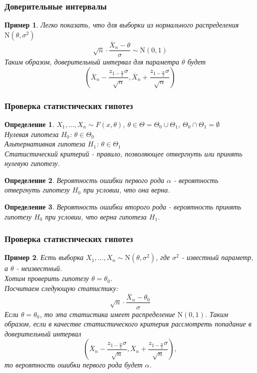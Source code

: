 \documentclass{beamer}
\newtheorem{defn}{Определение}
\newtheorem{exmp}{Пример}
\begin{document}
\begin{frame}
\frametitle{Доверительные интервалы}
\begin{exmp}
Легко показать, что для выборки из нормального распределения $\mathrm{N}(\theta,\sigma^2)$
$$\sqrt{n} \cdot \frac{\overline{X}_n - \theta}{\sigma} \sim \mathrm{N}(0,1)$$
Таким образом, доверительный интервал для параметра $\theta$ будет
$$(\overline{X}_n-\frac{z_{1-\frac{\alpha}{2}}\sigma}{\sqrt{n}},\overline{X}_n+\frac{z_{1-\frac{\alpha}{2}}\sigma}{\sqrt{n}})$$
\end{exmp}
\end{frame}

\begin{frame}
\frametitle{Проверка статистических гипотез}
\begin{defn}
$X_1,\ldots,X_n\sim F(x,\theta)$, $\theta \in \Theta=\Theta_0\cup\Theta_1$, $\Theta_0\cap\Theta_1=\emptyset$\\
Нулевая гипотеза $H_0$: $\theta \in \Theta_0$\\
Альтернативная гипотеза $H_1$: $\theta \in \Theta_1$\\
Статистический критерий - правило, позволяющее отвергнуть или принять нулевую гипотезу.
\end{defn}
\begin{defn}
Вероятность ошибки первого рода $\alpha$ - вероятность отвергнуть гипотезу $H_0$ при условии, что она верна.
\end{defn}
\begin{defn}
Вероятность ошибки второго рода - вероятность принять гипотезу $H_0$ при условии, что верна гипотеза $H_1$.
\end{defn}

\end{frame}

\begin{frame}
\frametitle{Проверка статистических гипотез}
\begin{exmp}
Есть выборка $X_1,\ldots,X_n\sim\mathrm{N}(\theta,\sigma^2)$, где $\sigma^2$ - известный параметр, а $\theta$ - неизвестный. \\Хотим проверить гипотезу $\theta=\theta_0$.\\
Посчитаем следующую статистику:
$$\sqrt{n} \cdot \frac{\overline{X}_n - \theta_0}{\sigma}$$
Если $\theta=\theta_0$, то эта статистика имеет распределение $\mathrm{N}(0,1)$.
Таким образом, если в качестве статистического критерия рассмотреть попадание в доверительный интервал $$(\overline{X}_n-\frac{z_{1-\frac{\alpha}{2}}\sigma}{\sqrt{n}},\overline{X}_n+\frac{z_{1-\frac{\alpha}{2}}\sigma}{\sqrt{n}}),$$
то вероятность ошибки первого рода будет $\alpha$.
\end{exmp}

\end{frame}
\end{document}
